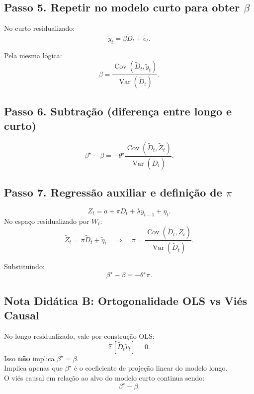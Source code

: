 \documentclass[
]{article}
\begin{document}
\subsection{\texorpdfstring{Passo 5. Repetir no modelo curto para obter
\(\beta\)}{Passo 5. Repetir no modelo curto para obter \textbackslash beta}}\label{passo-5.-repetir-no-modelo-curto-para-obter-beta}

No curto residualizado: \[
\widetilde{y}_t=\beta\widetilde{D}_t+\widetilde{e}_t.
\]

Pela mesma lógica: \[
\beta=\frac{\operatorname{Cov}(\widetilde{D}_t,\widetilde{y}_t)}
{\operatorname{Var}(\widetilde{D}_t)}.
\]

\subsection{Passo 6. Subtração (diferença entre longo e
curto)}\label{passo-6.-subtrauxe7uxe3o-diferenuxe7a-entre-longo-e-curto}

\[
\beta^\star-\beta
=
-\theta^\star
\frac{\operatorname{Cov}(\widetilde{D}_t,\widetilde{Z}_t)}
{\operatorname{Var}(\widetilde{D}_t)}.
\]

\subsection{\texorpdfstring{Passo 7. Regressão auxiliar e definição de
\(\pi\)}{Passo 7. Regressão auxiliar e definição de \textbackslash pi}}\label{passo-7.-regressuxe3o-auxiliar-e-definiuxe7uxe3o-de-pi}

\[
Z_t=a+\pi D_t+\lambda y_{t-1}+\eta_t.
\] No espaço residualizado por \(W_t\): \[
\widetilde{Z}_t=\pi\widetilde{D}_t+\widetilde{\eta}_t
\quad\Rightarrow\quad
\pi=
\frac{\operatorname{Cov}(\widetilde{D}_t,\widetilde{Z}_t)}
{\operatorname{Var}(\widetilde{D}_t)}.
\]

Substituindo: \[
\boxed{\beta^\star-\beta=-\theta^\star\pi.}
\]

\subsection{Nota Didática B: Ortogonalidade OLS vs Viés
Causal}\label{nota-diduxe1tica-b-ortogonalidade-ols-vs-viuxe9s-causal}

No longo residualizado, vale por construção OLS: \[
\mathbb{E}[\widetilde{D}_t\widetilde{v}_t]=0.
\] Isso \textbf{não} implica \(\beta^\star=\beta\).\\
Implica apenas que \(\beta^\star\) é o coeficiente de projeção linear do
modelo longo.\\
O viés causal em relação ao alvo do modelo curto continua sendo: \[
\beta^\star-\beta.
\]
\end{document}
